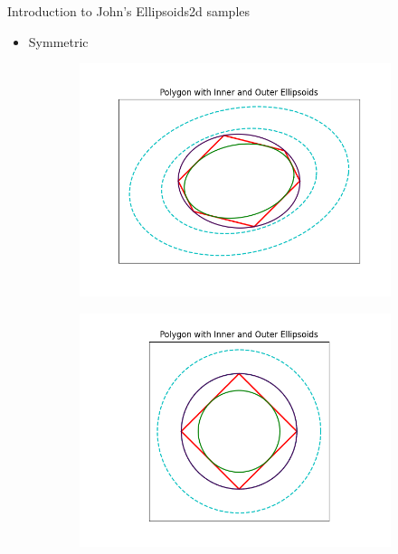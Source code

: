 \documentclass[
  english,            %
  aspectratio=169,    %
]{tumbeamer}
\begin{document}
\begin{frame}{Introduction to John's Ellipsoids}{2d samples}
  \begin{itemize}
    \item Symmetric
  \end{itemize}
  \begin{figure}
    \centering
    \begin{subfigure}[b]{0.4\textwidth}
        \includegraphics[width=\textwidth]{plots/sym_1.png}
    \end{subfigure}
    \begin{subfigure}[b]{0.4\textwidth}
        \includegraphics[width=\textwidth]{plots/sym_2.png}
    \end{subfigure}
  \end{figure}
\end{frame}
\end{document}
